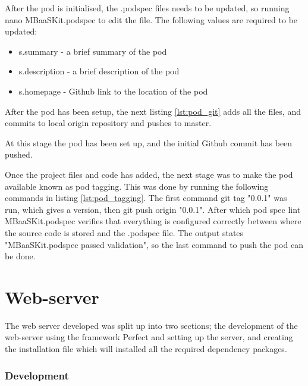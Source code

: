 After the pod is initialised, the .podspec files needs to be updated, so running nano MBaaSKit.podspec to edit the file. The following values are required to be updated: 

\begin{itemize}
  \item s.summary
  - a brief summary of the pod
  \item s.description
  - a brief description of the pod
  \item s.homepage
  - Github link to the location of the pod
\end{itemize}

After the pod has been setup, the next listing \ref{lst:pod_git} adds all the files, and commits to local origin repository and pushes to master.



At this stage the pod has been set up, and the initial Github commit has been pushed. 

Once the project files and code has added, the next stage was to make the pod available known as pod tagging. This was done by running the following commands in listing \ref{lst:pod_tagging}. The first command git tag "0.0.1" was run, which gives a version, then git push origin "0.0.1". After which pod spec lint MBaaSKit.podspec verifies that everything is configured correctly between where the source code is stored and the .podspec file. The output states "MBaaSKit.podspec passed validation", so the last command to push the pod can be done. 



\section{Web-server}

The web server developed was split up into two sections; the development of the web-server using the framework Perfect and setting up the server, and creating the installation file which will installed all the required dependency packages.

\subsubsection{Development}


